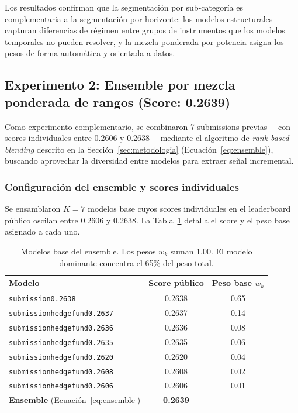 \documentclass{article}
\begin{document}
Los resultados confirman que la segmentación por sub-categoría es complementaria a la segmentación por horizonte: los modelos estructurales capturan diferencias de régimen entre grupos de instrumentos que los modelos temporales no pueden resolver, y la mezcla ponderada por potencia asigna los pesos de forma automática y orientada a datos.

\subsection{Experimento 2: Ensemble por mezcla ponderada de rangos (Score: 0.2639)}

Como experimento complementario, se combinaron 7 submissions previas —con scores individuales entre 0.2606 y 0.2638— mediante el algoritmo de \emph{rank-based blending} descrito en la Sección~\ref{sec:metodologia} (Ecuación~\ref{eq:ensemble}), buscando aprovechar la diversidad entre modelos para extraer señal incremental.

\subsubsection{Configuración del ensemble y scores individuales}

Se ensamblaron $K = 7$ modelos base cuyos scores individuales en el leaderboard público oscilan entre 0.2606 y 0.2638. La Tabla~\ref{tab:ensemble} detalla el score y el peso base asignado a cada uno.

\begin{table}[h!]
  \caption{Modelos base del ensemble. Los pesos $w_k$ suman 1.00. El modelo dominante concentra el 65\% del peso total.}
  \label{tab:ensemble}
  \centering
  \begin{tabular}{lcc}
    \toprule
    Modelo & Score público & Peso base $w_k$ \\
    \midrule
    \texttt{submission0.2638}        & 0.2638 & 0.65 \\
    \texttt{submissionhedgefund0.2637} & 0.2637 & 0.14 \\
    \texttt{submissionhedgefund0.2636} & 0.2636 & 0.08 \\
    \texttt{submissionhedgefund0.2635} & 0.2635 & 0.06 \\
    \texttt{submissionhedgefund0.2620} & 0.2620 & 0.04 \\
    \texttt{submissionhedgefund0.2608} & 0.2608 & 0.02 \\
    \texttt{submissionhedgefund0.2606} & 0.2606 & 0.01 \\
    \midrule
    \textbf{Ensemble} (Ecuación~\ref{eq:ensemble}) & \textbf{0.2639} & --- \\
    \bottomrule
  \end{tabular}
\end{table}
\end{document}
